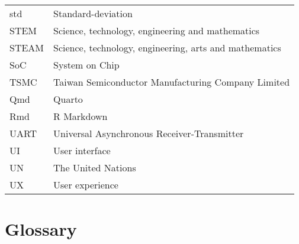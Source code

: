 {\begin{longtable}[h]{@{}p{} @{}p{}@{}}
std             & Standard-deviation \\
STEM            & Science, technology, engineering and mathematics \\
STEAM           & Science, technology, engineering, arts and mathematics \\
SoC             & System on Chip \\
TSMC            & Taiwan Semiconductor Manufacturing Company Limited \\
Qmd             & Quarto \\
Rmd             & R Markdown \\
UART            & Universal Asynchronous Receiver-Transmitter \\
UI              & User interface \\
UN              & The United Nations \\
UX              & User experience \\

\end{longtable}
}


\chapter*{Glossary}%
%
%
%


